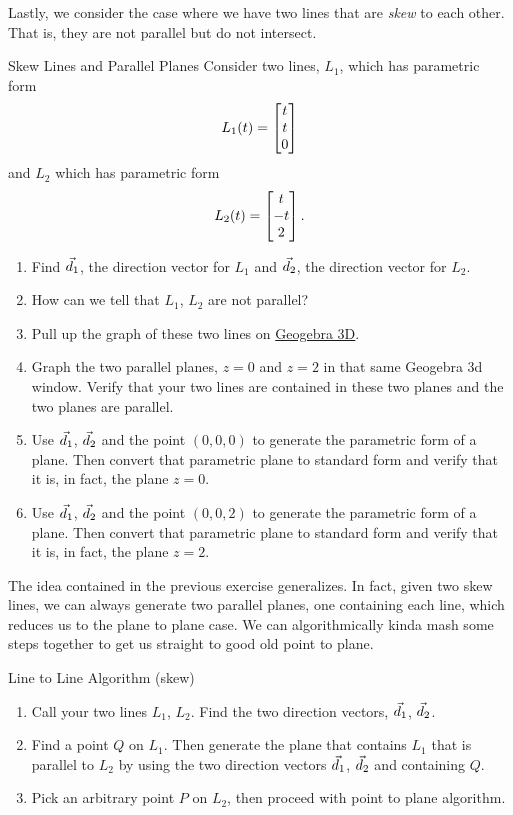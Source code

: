 Lastly, we consider the case where we have two lines that are \textit{skew} to each other. That is, they are not parallel but do not intersect.

\begin{exercise}{Skew Lines and Parallel Planes}
Consider two lines, $L_1$, which has parametric form $$L_1(t)=\begin{bmatrix}t\\t\\0\end{bmatrix}$$ and $L_2$ which has parametric form $$L_2(t)=\begin{bmatrix}t\\-t\\2\end{bmatrix}. $$
\begin{enumerate}
\item Find $\vec{d}_1$, the direction vector for $L_1$ and $\vec{d}_2$, the direction vector for $L_2$.
\vspace{1em}
\item How can we tell that $L_1$, $L_2$ are not parallel?
\vspace{1em}
\item Pull up the graph of these two lines on \href{https://www.geogebra.org/3d/dwvfymu7}{Geogebra 3D}.
\vspace{1em}
\item Graph the two parallel planes, $z=0$ and $z=2$ in that same Geogebra 3d window. Verify that your two lines are contained in these two planes and the two planes are parallel.
\vspace{1em}
\item Use $\vec{d}_1$, $\vec{d}_2$ and the point $(0,0,0)$ to generate the parametric form of a plane. Then convert that parametric plane to standard form and verify that it is, in fact, the plane $z=0$.
\vspace{1em}
\item Use $\vec{d}_1$, $\vec{d}_2$ and the point $(0,0,2)$ to generate the parametric form of a plane. Then convert that parametric plane to standard form and verify that it is, in fact, the plane $z=2$.
\end{enumerate}
\end{exercise}

The idea contained in the previous exercise generalizes. In fact, given two skew lines, we can always generate two parallel planes, one containing each line, which reduces us to the plane to plane case. We can algorithmically kinda mash some steps together to get us straight to good old point to plane.

\begin{claim}{Line to Line Algorithm (skew)}
\begin{enumerate}
\item Call your two lines $L_1$, $L_2$. Find the two direction vectors, $\vec{d}_1$, $\vec{d}_2$.
\vspace{1em}
\item Find a point $Q$ on $L_1$. Then generate the plane that contains $L_1$ that is parallel to $L_2$ by using the two direction vectors $\vec{d}_1$, $\vec{d}_2$ and containing $Q$.
\vspace{1em}
\item Pick an arbitrary point $P$ on $L_2$, then proceed with point to plane algorithm.
\end{enumerate}
\end{claim}

